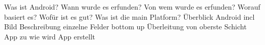 Was ist Android?
Wann wurde es erfunden?
Von wem wurde es erfunden?
Worauf basiert es?
Wofür ist es gut?
Was ist die main Platform?
Überblick Android incl Bild
Beschreibung einzelne Felder bottom up
Überleitung von oberste Schicht App zu wie wird App erstellt
